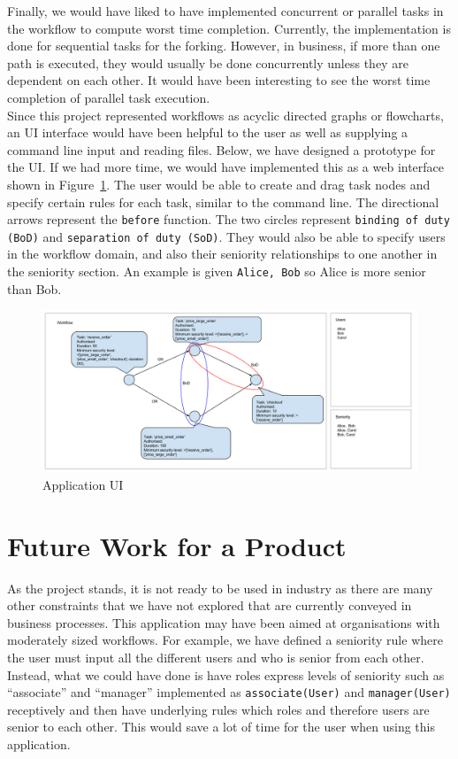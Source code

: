 \documentclass[a4paper]{report}
\begin{document}
Finally, we would have liked to have implemented concurrent or parallel tasks in the workflow to compute worst time completion. Currently, the implementation is done for sequential tasks for the forking. However, in business, if more than one path is executed, they would usually be done concurrently unless they are dependent on each other. It would have been interesting to see the worst time completion of parallel task execution. \\

Since this project represented workflows as acyclic directed graphs or flowcharts, an UI interface would have been helpful to the user as well as supplying a command line input and reading files. Below, we have designed a prototype for the UI. If we had more time, we would have implemented this as a web interface shown in Figure~\ref{fig:Application UI}. The user would be able to create and drag task nodes and specify certain rules for each task, similar to the command line. The directional arrows represent the \texttt{before} function. The two circles represent \texttt{binding of duty (BoD)} and \texttt{separation of duty (SoD)}. They would also be able to specify users in the workflow domain, and also their seniority relationships to one another in the seniority section. An example is given \texttt{Alice, Bob} so Alice is more senior than Bob.

\begin{figure}
\includegraphics[scale=0.35, angle=90,origin=c]{ui.png}
\caption{Application UI}
\label{fig:Application UI}
\end{figure}

\section{Future Work for a Product}
As the project stands, it is not ready to be used in industry as there are many other constraints that we have not explored that are currently conveyed in business processes. This application may have been aimed at organisations with moderately sized workflows. For example, we have defined a seniority rule where the user must input all the different users and who is senior from each other. Instead, what we could have done is have roles express levels of seniority such as ``associate'' and ``manager'' implemented as \texttt{associate(User)} and \texttt{manager(User)} receptively and then have underlying rules which roles and therefore users are senior to each other. This would save a lot of time for the user when using this application.\\
\end{document}
